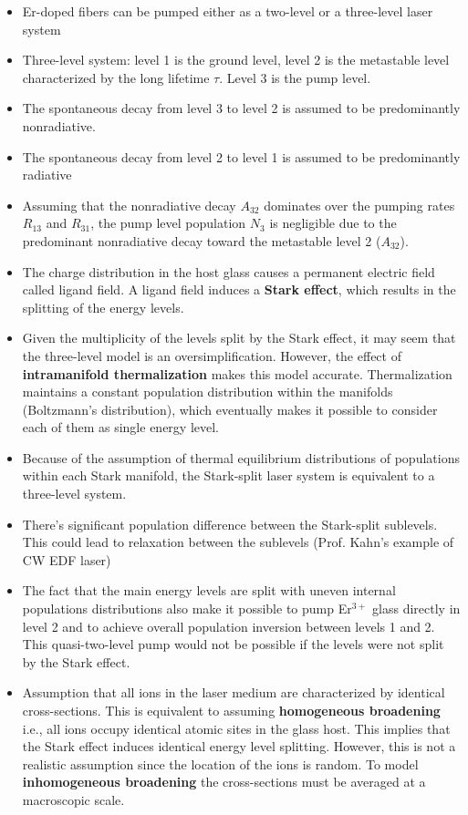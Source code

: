 \documentclass[a4paper]{article}
\begin{document}
\begin{itemize}
	\item Er-doped fibers can be pumped either as a two-level or a three-level  laser system
	\item Three-level system: level 1 is the ground level, level 2 is the metastable level characterized by the long lifetime $\tau$. Level 3 is the pump level.
	\item The spontaneous decay from level 3 to level 2 is assumed to be predominantly nonradiative.
	\item The spontaneous decay from level 2 to level 1 is assumed to be predominantly radiative
	\item Assuming that the nonradiative decay $A_{32}$ dominates over the pumping rates $R_{13}$ and $R_{31}$, the pump level population $N_3$ is negligible due to the predominant nonradiative decay toward the metastable level 2 ($A_{32}$).
	\item The charge distribution in the host glass causes a permanent electric field called ligand field. A ligand field induces a \textbf{Stark effect}, which results in the splitting of the energy levels.
	\item Given the multiplicity of the levels split by the Stark effect, it may seem that the three-level model is an oversimplification. However, the effect of \textbf{intramanifold thermalization} makes this model accurate. Thermalization maintains a constant population distribution within the manifolds (Boltzmann's distribution), which eventually makes it possible to consider each of them as single
	energy level.
	\item Because of the assumption of thermal equilibrium distributions of populations within each Stark manifold, the Stark-split laser system is equivalent to a three-level system.
	\item There's significant population difference between the Stark-split sublevels. This could lead to relaxation between the sublevels (Prof. Kahn's example of CW EDF laser)
	\item The fact that the main energy levels are split with uneven internal populations distributions also make it possible to pump Er$^{3+}$ glass directly in level 2 and to achieve overall population inversion between levels 1 and 2. This quasi-two-level pump would not be possible if the levels were not split by the Stark effect.
	\item Assumption that all ions in the laser medium are characterized by identical cross-sections. This is equivalent to assuming \textbf{homogeneous broadening} i.e., all ions occupy identical atomic sites in the glass host. This implies that the Stark effect induces identical energy level splitting. However, this is not a realistic assumption since the location of the ions is random. To model \textbf{inhomogeneous broadening} the cross-sections must be averaged at a macroscopic scale. 

\end{itemize}
\end{document}
